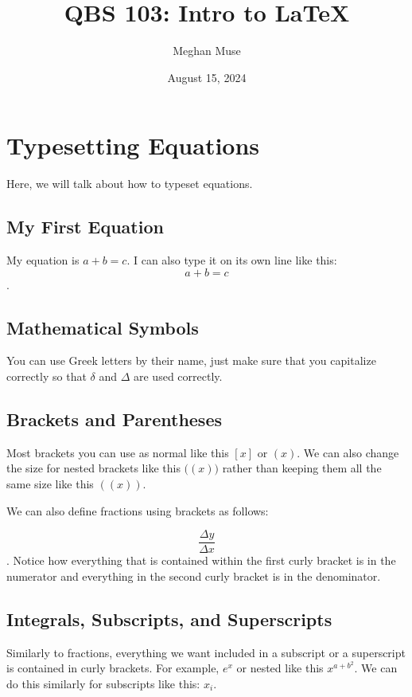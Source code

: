 \documentclass[12pt]{article}
\title{QBS 103: Intro to \LaTeX}
\author{Meghan Muse}
\date{August 15, 2024}
\begin{document}
\maketitle %

\tableofcontents

\newpage
\section{Typesetting Equations}

Here, we will talk about how to typeset equations.

\subsection{My First Equation}

My equation is $a + b = c$. I can also type it on its own line like this: \[a + b = c\].

\subsection{Mathematical Symbols}

You can use Greek letters by their name, just make sure that you capitalize correctly so that $\delta$ and $\Delta$ are used correctly.

\subsection{Brackets and Parentheses}

Most brackets you can use as normal like this $[x]$ or $(x)$. We can also change the size for nested brackets like this $\bigl( (x) \bigr)$ rather than keeping them all the same size like this $((x))$.

We can also define fractions using brackets as follows: 

\[ \frac{\Delta y}{\Delta x} \]. Notice how everything that is contained within the first curly bracket is in the numerator and everything in the second curly bracket is in the denominator.

\subsection{Integrals, Subscripts, and Superscripts}

Similarly to fractions, everything we want included in a subscript or a superscript is contained in curly brackets. For example, $e^{x}$ or nested like this $x^{a+b^{2}}$. We can do this similarly for subscripts like this: $x_{i}$.
\end{document}
